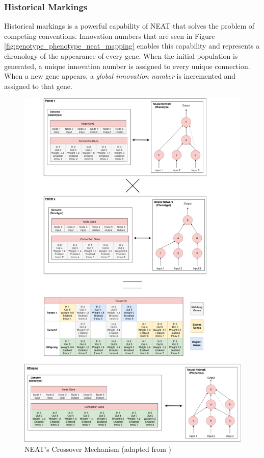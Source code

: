 \subsubsection{Historical Markings}
Historical markings is a powerful capability of NEAT that solves the problem of competing conventions. Innovation numbers that are seen in Figure \ref{fig:genotype_phenotype_neat_mapping} enables this capability and represents a chronology of the appearance of every gene. When the initial population is generated, a unique innovation number is assigned to every unique connection. When a new gene appears, a \textit{global innovation number} is incremented and assigned to that gene. 

\parbreak
\begin{figure}[H] %
	\centering %
	\includegraphics[width=\textwidth]{Figures/chapter_ne/ne_neat_crossover.png} %
	\caption{NEAT's Crossover Mechanism (adapted from \cite{stanley2002evolving})}
	\label{fig:neat_crossover} %
\end{figure}

